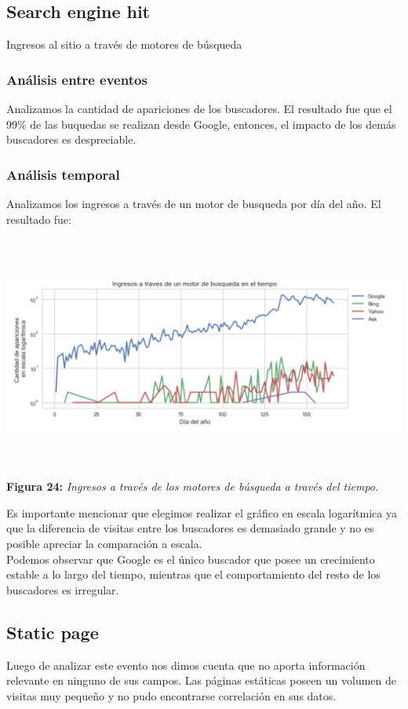 \documentclass[titlepage,a4paper]{article}
\begin{document}
	\subsection{Search engine hit}
	Ingresos al sitio a través de motores de búsqueda
	\subsubsection{Análisis entre eventos}
	Analizamos la cantidad de apariciones de los buscadores. El resultado fue que el 99\% de las buquedas se realizan desde Google, entonces, el impacto de los demás buscadores es despreciable. 
	\subsubsection{Análisis temporal}
	Analizamos los ingresos a través de un motor de busqueda por día del año. El resultado fue:
	
	\begin{center}
	\includegraphics[width=15cm,height = 8cm]{ingresosATravesDeMotorDeBusqEnTiempo.jpg}\\
	\textbf{Figura 24:}  \textit{Ingresos a través de los motores de búsqueda a través del tiempo. }
	\end{center}
	
	Es importante mencionar que elegimos realizar el gráfico en escala logarítmica ya que la diferencia de visitas entre los buscadores es demasiado grande y no es posible apreciar la comparación a escala.\\
	Podemos observar que Google es el único buscador que posee un crecimiento estable a lo largo del tiempo, mientras que el comportamiento del resto de los buscadores es irregular.\\
	\subsection{Static page}
	Luego de analizar este evento nos dimos cuenta que no aporta información relevante en ninguno de sus campos. Las páginas estáticas poseen un volumen de visitas muy pequeño y no pudo encontrarse correlación en sus datos.
\end{document}
